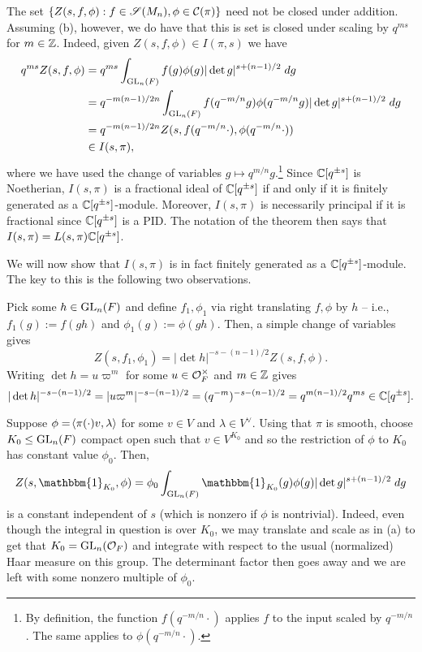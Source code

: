 \documentclass[11pt]{article}
\newcommand{\ind}{\mathbbm{1}}
\renewcommand{\S}{\mathscr{S}}
\begin{document}
The set $\{Z(s,f,\phi) : f\in\S(M_n),\phi\in\mc{C}(\pi)\}$ need not be closed under addition. Assuming (b), however, we do have that this is set is closed under scaling by $q^{ms}$ for $m\in\mathbb{Z}$. Indeed, given $Z(s,f,\phi)\in I(\pi,s)$ we have 
\begin{align*}
q^{ms}Z(s,f,\phi)
&=q^{ms}\int_{\textup{GL}_n(F)}f(g)\phi(g)|\det g|^{s+(n-1)/2}\;dg \\
&=q^{-m(n-1)/2n}\int_{\textup{GL}_n(F)}f(q^{-m/n}g)\phi(q^{-m/n}g)|\det g|^{s+(n-1)/2}\;dg \\
&=q^{-m(n-1)/2n}Z(s,f(q^{-m/n}\cdot),\phi(q^{-m/n}\cdot)) \\
&\in I(s,\pi),
\end{align*}
where we have used the change of variables $g\mapsto q^{m/n}g$.\footnote{By definition, the function $f(q^{-m/n}\cdot)$ applies $f$ to the input scaled by $q^{-m/n}$. The same applies to $\phi(q^{-m/n}\cdot)$.} Since $\mathbb{C}[q^{\pm s}]$ is Noetherian, $I(s,\pi)$ is a fractional ideal of $\mathbb{C}[q^{\pm s}]$ if and only if it is finitely generated as a $\mathbb{C}[q^{\pm s}]$-module. Moreover, $I(s,\pi)$ is necessarily principal if it is fractional since $\mathbb{C}[q^{\pm s}]$ is a PID. The notation of the theorem then says that $I(s,\pi)=L(s,\pi)\mathbb{C}[q^{\pm s}]$.

We will now show that $I(s,\pi)$ is in fact finitely generated as a $\mathbb{C}[q^{\pm s}]$-module. The key to this is the following two observations.
\begin{enum}{\alph}
\item Pick some $h\in\textup{GL}_n(F)$ and define $f_1,\phi_1$ via right translating $f,\phi$ by $h$ -- i.e., $f_1(g):=f(gh)$ and $\phi_1(g):=\phi(gh)$. Then, a simple change of variables gives 
$$Z(s,f_1,\phi_1)=|\det h|^{-s-(n-1)/2}Z(s,f,\phi).$$ 
Writing $\det h=u\varpi^m$ for some $u\in\mathcal{O}_F^{\times}$ and $m\in\mathbb{Z}$ gives 
$$|\det h|^{-s-(n-1)/2}=|u\varpi^m|^{-s-(n-1)/2}=(q^{-m})^{-s-(n-1)/2}=q^{m(n-1)/2}q^{ms}\in\mathbb{C}[q^{\pm s}].$$

\item Suppose $\phi=\!\left\langle\pi(\cdot)v,\lambda\right\rangle$ for some $v\in V$ and $\lambda\in V^{\vee}$. Using that $\pi$ is smooth, choose $K_0\leq\textup{GL}_n(F)$ compact open such that $v\in V^{K_0}$ and so the restriction of $\phi$ to $K_0$ has constant value $\phi_0$. Then,
$$Z(s,\ind_{K_0},\phi)=\phi_0\int_{\GL_n(F)}\ind_{K_0}(g)\phi(g)|\det g|^{s+(n-1)/2}\;dg$$
is a constant independent of $s$ (which is nonzero if $\phi$ is nontrivial). Indeed, even though the integral in question is over $K_0$, we may translate and scale as in (a) to get that $K_0=\textup{GL}_n(\mathcal{O}_F)$ and integrate with respect to the usual (normalized) Haar measure on this group. The determinant factor then goes away and we are left with some nonzero multiple of $\phi_0$.
\end{enum}
\end{document}

